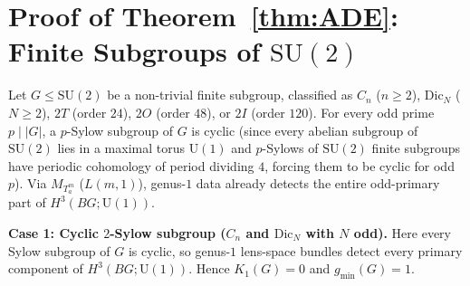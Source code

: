 \documentclass[11pt]{amsart}
\theoremstyle{definition}
\theoremstyle{remark}
\newcommand{\U}{\mathrm{U}}
\newcommand{\SU}{\mathrm{SU}}
\newcommand{\Dic}{\mathrm{Dic}}
\begin{document}
\section{Proof of Theorem~\ref{thm:ADE}: Finite Subgroups of $\SU(2)$}

Let $G \le \SU(2)$ be a non-trivial finite subgroup, classified as $C_n$ ($n \ge 2$), $\Dic_N$ ($N \ge 2$), $2T$ (order $24$), $2O$ (order $48$), or $2I$ (order $120$).
For every odd prime $p \mid |G|$, a $p$-Sylow subgroup of $G$ is cyclic (since every abelian subgroup of $\SU(2)$ lies in a maximal torus $\U(1)$ and $p$-Sylows of $\SU(2)$ finite subgroups have periodic cohomology of period dividing $4$, forcing them to be cyclic for odd $p$).
Via $M_{T_a^m}$ ($L(m,1)$), genus-$1$ data already detects the entire odd-primary part of $H^3(BG;\U(1))$.

\textbf{Case 1: Cyclic $2$-Sylow subgroup ($C_n$ and $\Dic_N$ with $N$ odd).}
Here every Sylow subgroup of $G$ is cyclic, so genus-$1$ lens-space bundles detect every primary component of $H^3(BG;\U(1))$. Hence $K_1(G)=0$ and $g_{\min}(G)=1$.
\end{document}
